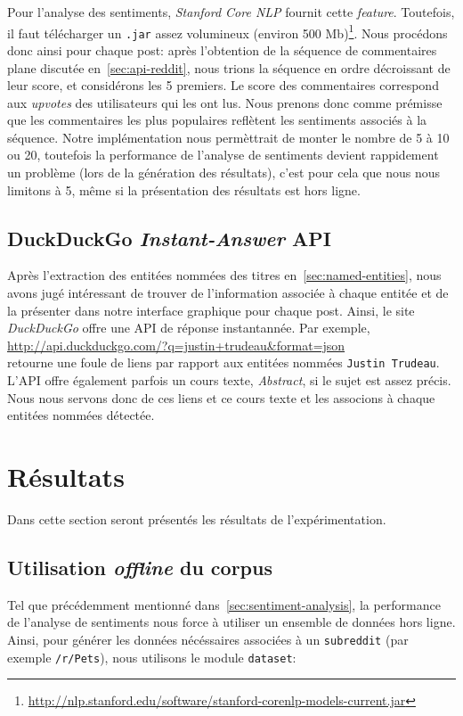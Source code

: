\documentclass[12pt]{article}
\begin{document}
Pour l'analyse des sentiments, \textit{Stanford Core NLP} fournit cette \textit{feature}. Toutefois, il faut télécharger un \verb;.jar; assez volumineux (environ 500 Mb)\footnote{\url{http://nlp.stanford.edu/software/stanford-corenlp-models-current.jar}}. Nous procédons donc ainsi pour chaque post: après l'obtention de la séquence de commentaires plane discutée en~\ref{sec:api-reddit}, nous trions la séquence en ordre décroissant de leur score, et considérons les 5 premiers. Le score des commentaires correspond aux \textit{upvotes} des utilisateurs qui les ont lus. Nous prenons donc comme prémisse que les commentaires les plus populaires reflètent les sentiments associés à la séquence. Notre implémentation nous permèttrait de monter le nombre de 5 à 10 ou 20, toutefois la performance de l'analyse de sentiments devient rappidement un problème (lors de la génération des résultats), c'est pour cela que nous nous limitons à 5, même si la présentation des résultats est hors ligne.

\subsection{DuckDuckGo \textit{Instant-Answer} API}

Après l'extraction des entitées nommées des titres en~\ref{sec:named-entities}, nous avons jugé intéressant de trouver de l'information associée à chaque entitée et de la présenter dans notre interface graphique pour chaque post. Ainsi, le site \textit{DuckDuckGo} offre une API de réponse instantannée. Par exemple,\\

\url{http://api.duckduckgo.com/?q=justin+trudeau&format=json}\\

retourne une foule de liens par rapport aux entitées nommées \verb;Justin Trudeau;. L'API offre également parfois un cours texte, \textit{Abstract}, si le sujet est assez précis. Nous nous servons donc de ces liens et ce cours texte et les associons à chaque entitées nommées détectée.

\section{Résultats}

Dans cette section seront présentés les résultats de l'expérimentation.

\subsection{Utilisation \textit{offline} du corpus}
Tel que précédemment mentionné dans~\ref{sec:sentiment-analysis}, la performance de l'analyse de sentiments nous force à utiliser un ensemble de données hors ligne. Ainsi, pour générer les données nécéssaires associées à un \verb;subreddit; (par exemple \verb;/r/Pets;), nous utilisons le module \verb;dataset;:
\end{document}
